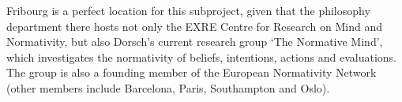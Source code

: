 Fribourg is a perfect location for this subproject, given that the philosophy department there hosts not only the EXRE Centre for Research on Mind and Normativity, but also Dorsch's current research group `The Normative Mind', which investigates the normativity of beliefs, intentions, actions and evaluations. The group is also a founding member of the European Normativity Network (other members include Barcelona, Paris, Southampton and Oslo). 
